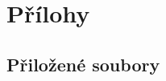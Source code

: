 \documentclass[12pt,a4paper]{report}
\begin{document}



\tableofcontents















\appendix
\chapter{Přílohy}

\section{Přiložené soubory}\label{content}
\end{document}
